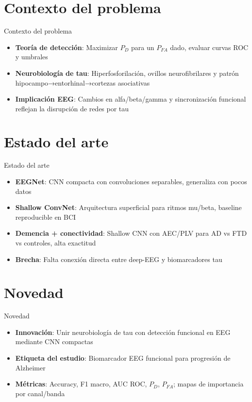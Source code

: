 \documentclass{beamer}
\begin{document}
\section{Contexto del problema}
\begin{frame}{Contexto del problema}
\begin{itemize}
  \item \textbf{Teoría de detección}: Maximizar \(P_{D}\) para un \(P_{FA}\) dado, evaluar curvas ROC y umbrales \cite{Kay1998}
  \item \textbf{Neurobiología de tau}: Hiperfosforilación, ovillos neurofibrilares y patrón hipocampo→entorhinal→cortezas asociativas \cite{Tolnay1999}
  \item \textbf{Implicación EEG}: Cambios en alfa/beta/gamma y sincronización funcional reflejan la disrupción de redes por tau \cite{dePaula2009}
\end{itemize}
\end{frame}

\section{Estado del arte}
\begin{frame}{Estado del arte}
\begin{itemize}
  \item \textbf{EEGNet}: CNN compacta con convoluciones separables, generaliza con pocos datos \cite{Lawhern2018}
  \item \textbf{Shallow ConvNet}: Arquitectura superficial para ritmos mu/beta, baseline reproducible en BCI \cite{Schirrmeister2017}
  \item \textbf{Demencia + conectividad}: Shallow CNN con AEC/PLV para AD vs FTD vs controles, alta exactitud \cite{Ajra2023}
  \item \textbf{Brecha}: Falta conexión directa entre deep-EEG y biomarcadores tau \cite{dePaula2009}
\end{itemize}
\end{frame}

\section{Novedad}
\begin{frame}{Novedad}
\begin{itemize}
  \item \textbf{Innovación}: Unir neurobiología de tau con detección funcional en EEG mediante CNN compactas \cite{Lawhern2018,Ajra2023}
  \item \textbf{Etiqueta del estudio}: Biomarcador EEG funcional para progresión de Alzheimer
  \item \textbf{Métricas}: Accuracy, F1 macro, AUC ROC, \(P_D\), \(P_{FA}\); mapas de importancia por canal/banda \cite{Kay1998}
\end{itemize}
\end{frame}
\end{document}
